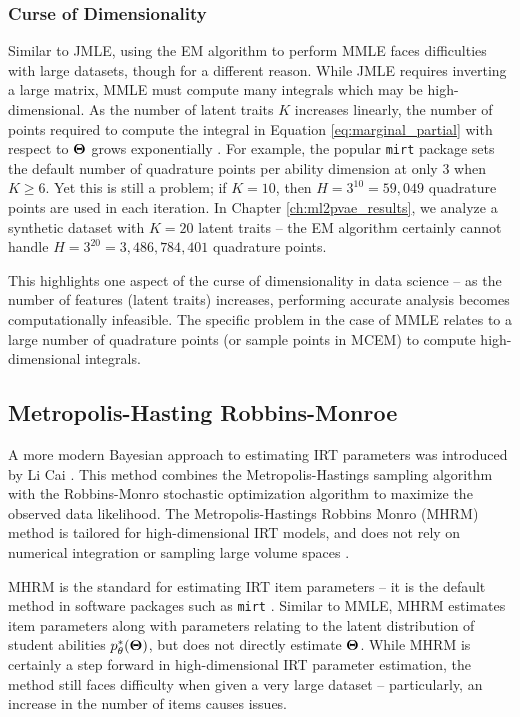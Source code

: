 \subsubsection{Curse of Dimensionality} \label{sec:dim}
Similar to JMLE, using the EM algorithm to perform MMLE faces difficulties with large datasets, though for a different reason. While JMLE requires inverting a large matrix, MMLE must compute many integrals which may be high-dimensional. As the number of latent traits $K$ increases linearly, the number of points required to compute the integral in Equation \ref{eq:marginal_partial} with respect to $\boldsymbol{\Theta}$ grows exponentially \cite{cai2010}. For example, the popular \verb!mirt! package \cite{mirt} sets the default number of quadrature points per ability dimension at only $3$ when $K\geq6$. Yet this is still a problem; if $K=10$, then $H = 3^{10} = 59,049$ quadrature points are used in each iteration. In Chapter \ref{ch:ml2pvae_results}, we analyze a synthetic dataset with $K=20$ latent traits -- the EM algorithm certainly cannot handle $H=3^{20} = 3,486,784,401$ quadrature points.

This highlights one aspect of the curse of dimensionality in data science -- as the number of features (latent traits) increases, performing accurate analysis becomes computationally infeasible. The specific problem in the case of MMLE relates to a large number of quadrature points (or sample points in MCEM) to compute high-dimensional integrals.


\subsection{Metropolis-Hasting Robbins-Monroe}
A more modern Bayesian approach to estimating IRT parameters was introduced by Li Cai \cite{cai2009, cai2010}. This method combines the Metropolis-Hastings sampling algorithm \cite{hastings1970} with the Robbins-Monro stochastic optimization algorithm \cite{robbins1951} to maximize the observed data likelihood. The Metropolis-Hastings Robbins Monro (MHRM) method is tailored for high-dimensional IRT models, and does not rely on numerical integration or sampling large volume spaces \cite{han2014}. 

MHRM is the standard for estimating IRT item parameters -- it is the default method in software packages such as \verb!mirt! \cite{mirt}. Similar to MMLE, MHRM estimates item parameters along with parameters relating to the latent distribution of student abilities $p_\theta^*(\boldsymbol{\Theta})$, but does not directly estimate $\boldsymbol{\Theta}$. While MHRM is certainly a step forward in high-dimensional IRT parameter estimation, the method still faces difficulty when given a very large dataset -- particularly, an increase in the number of items causes issues.

